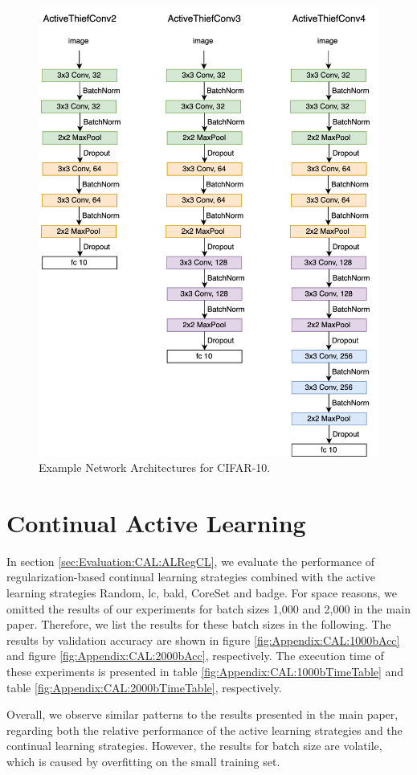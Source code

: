 \begin{figure}[!htb]
    \centering
    \includegraphics[width=\linewidth]{images/ActiveThiefConvs.png}
    \caption[ActiveThiefConv Architectures]{Example Network Architectures for CIFAR-10.}
    \label{fig:ActiveThiefArchitectures}
\end{figure}

\clearpage

\section{Continual Active Learning}
\label{sec:Appendix:ContinualActiveLearning}
In section \ref{sec:Evaluation:CAL:ALRegCL}, we evaluate the performance of regularization-based continual learning strategies combined with the active learning
strategies Random, \gls{lc}, \gls{bald}, CoreSet and \gls{badge}. For space reasons, we omitted the results of our experiments for batch sizes 1,000 and 2,000 in 
the main paper. Therefore, we list the results for these batch sizes in the following. The results by validation accuracy are shown in figure
\ref{fig:Appendix:CAL:1000bAcc} and figure \ref{fig:Appendix:CAL:2000bAcc}, respectively. The execution time of these experiments is presented in table 
\ref{fig:Appendix:CAL:1000bTimeTable} and table \ref{fig:Appendix:CAL:2000bTimeTable}, respectively. \par
Overall, we observe similar patterns to the results presented in the main paper, regarding both the relative performance of the active learning strategies and
the continual learning strategies. However, the results for batch size are volatile, which is caused by overfitting on the small training set. 


